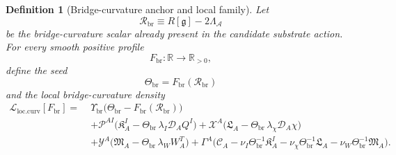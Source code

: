\documentclass[11pt]{article}
\newcommand{\Sub}{\mathcal{A}}
\newcommand{\BridgeMetric}{\mathfrak g}
\newcommand{\SpatialD}{\mathcal D}
\newcommand{\ConstCurrent}{\mathcal C}
\newcommand{\ConstGamma}{\Gamma}
\newcommand{\CurvQMult}{\mathscr P}
\newcommand{\CurvChiMult}{\mathscr X}
\newcommand{\CurvTransMult}{\mathscr Y}
\newcommand{\CurvSeed}{\Theta_{\mathrm{br}}}
\newcommand{\CurvSeedMult}{\Upsilon_{\mathrm{br}}}
\newcommand{\CurvProfile}{F_{\mathrm{br}}}
\newcommand{\CurvOneI}{\mathfrak K}
\newcommand{\CurvOneChi}{\mathfrak L}
\newcommand{\CurvOneW}{\mathfrak M}
\newcommand{\BridgeCurv}{\mathcal R_{\mathrm{br}}}
\newtheorem{definition}{Definition}
\begin{document}
\begin{definition}[Bridge-curvature anchor and local family]
\label{def:family}
Let
\begin{equation}
\BridgeCurv \equiv R[\BridgeMetric]-2\Lambda_{\Sub}
\label{eq:anchor}
\end{equation}
be the bridge-curvature scalar already present in the candidate substrate action. For every smooth positive profile
\begin{equation}
\CurvProfile:\mathbb R\to\mathbb R_{>0},
\label{eq:positiveprofile}
\end{equation}
define the seed
\begin{equation}
\CurvSeed=\CurvProfile(\BridgeCurv)
\label{eq:seed}
\end{equation}
and the local bridge-curvature density
\begin{align}
\mathcal L_{\mathrm{loc.curv}}[\CurvProfile]
=\;&
\CurvSeedMult\bigl(\CurvSeed-\CurvProfile(\BridgeCurv)\bigr)
\nonumber\\
&+\CurvQMult^{AI}\bigl(\CurvOneI_A^I-\CurvSeed\,\lambda_I\SpatialD_AQ^I\bigr)
+\CurvChiMult^A\bigl(\CurvOneChi_A-\CurvSeed\,\lambda_\chi\SpatialD_A\chi\bigr)
\nonumber\\
&+\CurvTransMult^A\bigl(\CurvOneW_A-\CurvSeed\,\lambda_WW_A^T\bigr)
+\ConstGamma^A\bigl(
\ConstCurrent_A
-\nu_I\CurvSeed^{-1}\CurvOneI_A^I
-\nu_\chi\CurvSeed^{-1}\CurvOneChi_A
-\nu_W\CurvSeed^{-1}\CurvOneW_A
\bigr).
\label{eq:locfamily}
\end{align}
\end{definition}
\end{document}
